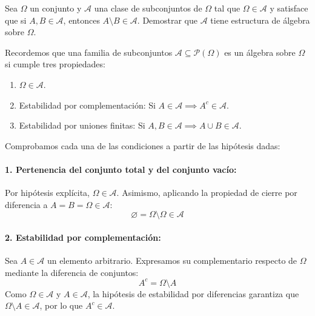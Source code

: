 \newpage
\begin{problema}
Sea $\Omega$ un conjunto y $\mathcal{A}$ una clase de subconjuntos de $\Omega$ tal que $\Omega \in \mathcal{A}$ y satisface que si $A, B \in \mathcal{A}$, entonces $A \setminus B \in \mathcal{A}$. Demostrar que $\mathcal{A}$ tiene estructura de álgebra sobre $\Omega$.

\tcblower

Recordemos que una familia de subconjuntos $\mathcal{A} \subseteq \mathcal{P}(\Omega)$ es un álgebra sobre $\Omega$ si cumple tres propiedades:
\begin{enumerate}[label=\arabic*.]
    \item $\Omega \in \mathcal{A}$.
    \item Estabilidad por complementación: Si $A \in \mathcal{A} \implies A^c \in \mathcal{A}$.
    \item Estabilidad por uniones finitas: Si $A, B \in \mathcal{A} \implies A \cup B \in \mathcal{A}$.
\end{enumerate}

Comprobamos cada una de las condiciones a partir de las hipótesis dadas:

\paragraph{1. Pertenencia del conjunto total y del conjunto vacío:}
Por hipótesis explícita, $\Omega \in \mathcal{A}$.
Asimismo, aplicando la propiedad de cierre por diferencia a $A = B = \Omega \in \mathcal{A}$:
\[
    \varnothing = \Omega \setminus \Omega \in \mathcal{A}
\]

\paragraph{2. Estabilidad por complementación:}
Sea $A \in \mathcal{A}$ un elemento arbitrario. Expresamos su complementario respecto de $\Omega$ mediante la diferencia de conjuntos:
\[
    A^c = \Omega \setminus A
\]
Como $\Omega \in \mathcal{A}$ y $A \in \mathcal{A}$, la hipótesis de estabilidad por diferencias garantiza que $\Omega \setminus A \in \mathcal{A}$, por lo que $A^c \in \mathcal{A}$.


\end{problema}
